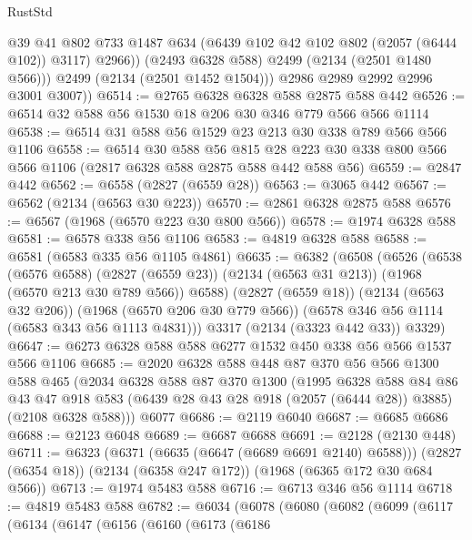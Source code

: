 \begin{lexlean}{RustStd}
\begin{coremodule}
                @39
                @41
                @802
                @733
                @1487
                @634
                (@6439 @102 @42 @102 @802 (@2057 (@6444 @102)) @3117)
                @2966))
            (@2493 @6328 @588)
            @2499
            (@2134 (@2501 @1480 @566)))
          @2499
          (@2134 (@2501 @1452 @1504)))
        @2986
        @2989
        @2992
        @2996
        @3001
        @3007))
@6514 := @2765 @6328 @6328 @588 @2875 @588 @442
@6526 := @6514 @32 @588 @56 @1530 @18 @206 @30 @346 @779 @566 @566 @1114
@6538 := @6514 @31 @588 @56 @1529 @23 @213 @30 @338 @789 @566 @566 @1106
@6558 := @6514
    @30
    @588
    @56
    @815
    @28
    @223
    @30
    @338
    @800
    @566
    @566
    @1106
    (@2817 @6328 @588 @2875 @588 @442 @588 @56)
@6559 := @2847 @442
@6562 := @6558 (@2827 (@6559 @28))
@6563 := @3065 @442
@6567 := @6562 (@2134 (@6563 @30 @223))
@6570 := @2861 @6328 @2875 @588
@6576 := @6567 (@1968 (@6570 @223 @30 @800 @566))
@6578 := @1974 @6328 @588
@6581 := @6578 @338 @56 @1106
@6583 := @4819 @6328 @588
@6588 := @6581 (@6583 @335 @56 @1105 @4861)
@6635 := @6382
    (@6508
      (@6526
        (@6538
          (@6576 @6588)
          (@2827 (@6559 @23))
          (@2134 (@6563 @31 @213))
          (@1968 (@6570 @213 @30 @789 @566))
          @6588)
        (@2827 (@6559 @18))
        (@2134 (@6563 @32 @206))
        (@1968 (@6570 @206 @30 @779 @566))
        (@6578 @346 @56 @1114 (@6583 @343 @56 @1113 @4831)))
      @3317
      (@2134 (@3323 @442 @33))
      @3329)
@6647 := @6273 @6328 @588 @588 @6277 @1532 @450 @338 @56 @566 @1537 @566 @1106
@6685 := @2020
    @6328
    @588
    @448
    @87
    @370
    @56
    @566
    @1300
    @588
    @465
    (@2034
      @6328
      @588
      @87
      @370
      @1300
      (@1995
        @6328
        @588
        @84
        @86
        @43
        @47
        @918
        @583
        (@6439 @28 @43 @28 @918 (@2057 (@6444 @28)) @3885)
        (@2108 @6328 @588)))
    @6077
@6686 := @2119 @6040
@6687 := @6685 @6686
@6688 := @2123 @6048
@6689 := @6687 @6688
@6691 := @2128 (@2130 @448)
@6711 := @6323
    (@6371 (@6635 (@6647 (@6689 @6691 @2140) @6588)))
    (@2827 (@6354 @18))
    (@2134 (@6358 @247 @172))
    (@1968 (@6365 @172 @30 @684 @566))
@6713 := @1974 @5483 @588
@6716 := @6713 @346 @56 @1114
@6718 := @4819 @5483 @588
@6782 := @6034
    (@6078
      (@6080
        (@6082
          (@6099
            (@6117
              (@6134
                (@6147
                  (@6156
                    (@6160
                      (@6173
                        (@6186

\end{coremodule}
\end{lexlean}
